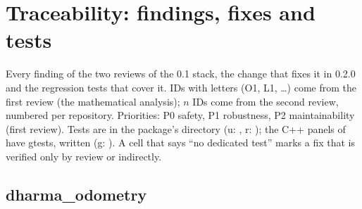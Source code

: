 \chapter{Traceability: findings, fixes and tests}
\label{app:trace}

Every finding of the two reviews of the 0.1 stack, the change that fixes it in 0.2.0 and the
regression tests that cover it. IDs with letters (O1, L1, \ldots) come from the first review (the
mathematical analysis); \code{\#}$n$ IDs come from the second review, numbered per repository.
Priorities: P0 safety, P1 robustness, P2 maintainability (first review). Tests are
 in the package's  directory (u: , r:
); the C++ panels of  have gtests, written
 (g: ). A cell that says ``no dedicated test'' marks a fix that
is verified only by review or indirectly.

\section{dharma\_odometry}


